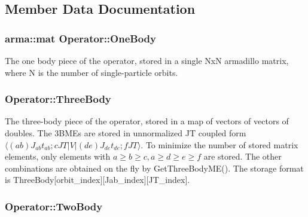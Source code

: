 \subsection{Member Data Documentation}
\hypertarget{classOperator_a14b1c78e0be45772aa57168c74d1b57c}{
\subsubsection[{One\-Body}]{\setlength{\rightskip}{0pt plus 5cm}arma\-::mat Operator\-::\-One\-Body}}\label{classOperator_a14b1c78e0be45772aa57168c74d1b57c}
The one body piece of the operator, stored in a single Nx\-N armadillo matrix, where N is the number of single-\/particle orbits. \hypertarget{classOperator_ac9d7e28ec1958d5065e12cbf0c0e3541}{
\subsubsection[{Three\-Body}]{ Operator\-::\-Three\-Body}}\label{classOperator_ac9d7e28ec1958d5065e12cbf0c0e3541}
The three-\/body piece of the operator, stored in a map of vectors of vectors of doubles. The 3\-B\-M\-Es are stored in unnormalized J\-T coupled form $ \langle (ab)J_{ab}t_{ab};cJT | V | (de)J_{de}t_{de};f JT \rangle $. To minimize the number of stored matrix elements, only elements with $ a\geq b \geq c, a\geq d\geq e \geq f $ are stored. The other combinations are obtained on the fly by Get\-Three\-Body\-M\-E(). The storage format is Three\-Body\mbox{[}orbit\-\_\-index\mbox{]}\mbox{[}Jab\-\_\-index\mbox{]}\mbox{[}J\-T\-\_\-index\mbox{]}. \hypertarget{classOperator_add51ac69970faff9936192fec4181e00}{
\subsubsection[{Two\-Body}]{ Operator\-::\-Two\-Body}}\label{classOperator_add51ac69970faff9936192fec4181e00}
